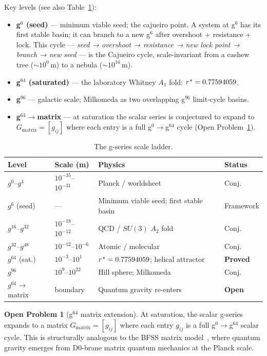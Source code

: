 \documentclass[12pt,a4paper]{article}
\theoremstyle{plain}
\theoremstyle{definition}
\newtheorem{openproblem}[theorem]{Open Problem}
\theoremstyle{remark}
\newcommand{\rstar}{r^{\kern0.5pt\star}}
\begin{document}
Key levels (see also Table~\ref{tab:gseries}):
\begin{itemize}[leftmargin=1.4em]
  \item \textbf{g$^6$ (seed)} — minimum viable seed; the cajueiro point.
    A system at g$^6$ has its first stable basin; it can branch to a new g$^6$
    after overshoot + resistance + lock. This cycle — \emph{seed → overshoot →
    resistance → new lock point → branch → new seed} — is the Cajueiro cycle,
    scale-invariant from a cashew tree ($\sim10^0$\,m) to a nebula ($\sim10^{16}$\,m).
  \item \textbf{g$^{64}$ (saturated)} — the laboratory Whitney $A_1$ fold:
    $\rstar=0.77594059$.
  \item \textbf{g$^{96}$} — galactic scale; Milkomeda as two overlapping
    g$^{96}$ limit-cycle basins.
  \item \textbf{g$^{64}\to$matrix} — at saturation the scalar series is
    conjectured to expand to $G_{\mathrm{matrix}}=[g_{ij}]$ where each entry
    is a full g$^0\to$g$^{64}$ cycle (Open Problem~\ref{op:matrix}).
\end{itemize}

\begin{table}[h]
\centering
\caption{The g-series scale ladder.}
\label{tab:gseries}
\begin{tabular}{@{}llll@{}}
\toprule
\textbf{Level} & \textbf{Scale (m)} & \textbf{Physics} & \textbf{Status}\\
\midrule
$g^0$--$g^4$ & $10^{-35}$--$10^{-31}$ & Planck / worldsheet & Conj.\\
$g^6$ (seed) & — & Minimum viable seed; first stable basin & Framework\\
$g^{16}$--$g^{32}$ & $10^{-18}$--$10^{-12}$ & QCD / $SU(3)$ $A_2$ fold & Conj.\\
$g^{32}$--$g^{48}$ & $10^{-12}$--$10^{-6}$ & Atomic / molecular & Conj.\\
$g^{64}$ (sat.) & $10^{-3}$--$10^1$ & $\rstar=0.77594059$; helical attractor & \textbf{Proved}\\
$g^{96}$ & $10^{9}$--$10^{22}$ & Hill sphere; Milkomeda & Conj.\\
$g^{64}\to$matrix & boundary & Quantum gravity re-enters & \textbf{Open}\\
\bottomrule
\end{tabular}
\end{table}

\begin{openproblem}[g$^{64}$ matrix extension]\label{op:matrix}
At saturation, the scalar g-series expands to a matrix
$G_{\mathrm{matrix}}=[g_{ij}]$
where each entry $g_{ij}$ is a full g$^0\to$g$^{64}$ scalar cycle.
This is structurally analogous to the BFSS matrix model~\cite{BFSS1997},
where quantum gravity emerges from D0-brane matrix quantum mechanics at the
Planck scale.
\end{openproblem}
\end{document}
